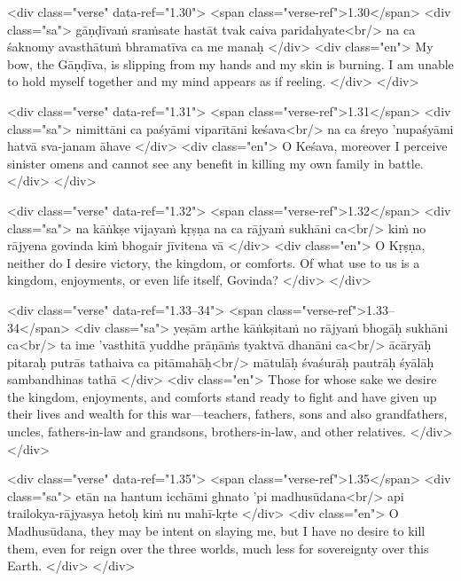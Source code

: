 \begin{html}
<div class="verse" data-ref="1.30">
  <span class="verse-ref">1.30</span>
  <div class="sa">
    gāṇḍīvaṁ sraṁsate hastāt tvak caiva paridahyate<br/>
    na ca śaknomy avasthātuṁ bhramatīva ca me manaḥ
  </div>
  <div class="en">
    My bow, the Gāṇḍīva, is slipping from my hands and my skin is burning. I am unable to hold myself together and my mind appears as if reeling.
  </div>
</div>
\end{html}



\begin{html}
<div class="verse" data-ref="1.31">
  <span class="verse-ref">1.31</span>
  <div class="sa">
    nimittāni ca paśyāmi viparītāni keśava<br/>
    na ca śreyo ’nupaśyāmi hatvā sva-janam āhave
  </div>
  <div class="en">
    O Keśava, moreover I perceive sinister omens and cannot see any benefit in killing my own family in battle.
  </div>
</div>
\end{html}



\begin{html}
<div class="verse" data-ref="1.32">
  <span class="verse-ref">1.32</span>
  <div class="sa">
    na kāṅkṣe vijayaṁ kṛṣṇa na ca rājyaṁ sukhāni ca<br/>
    kiṁ no rājyena govinda kiṁ bhogair jīvitena vā
  </div>
  <div class="en">
    O Kṛṣṇa, neither do I desire victory, the kingdom, or comforts. Of what use to us is a kingdom, enjoyments, or even life itself, Govinda?
  </div>
</div>
\end{html}



\begin{html}
<div class="verse" data-ref="1.33–34">
  <span class="verse-ref">1.33–34</span>
  <div class="sa">
    yeṣām arthe kāṅkṣitaṁ no rājyaṁ bhogāḥ sukhāni ca<br/>
    ta ime ’vasthitā yuddhe prāṇāṁs tyaktvā dhanāni ca<br/>
    ācāryāḥ pitaraḥ putrās tathaiva ca pitāmahāḥ<br/>
    mātulāḥ śvaśurāḥ pautrāḥ śyālāḥ sambandhinas tathā
  </div>
  <div class="en">
    Those for whose sake we desire the kingdom, enjoyments, and comforts stand ready to fight and have given up their lives and wealth for this war---teachers, fathers, sons and also grandfathers, uncles, fathers-in-law and grandsons, brothers-in-law, and other relatives.
  </div>
</div>
\end{html}



\begin{html}
<div class="verse" data-ref="1.35">
  <span class="verse-ref">1.35</span>
  <div class="sa">
    etān na hantum icchāmi ghnato ’pi madhusūdana<br/>
    api trailokya-rājyasya hetoḥ kiṁ nu mahī-kṛte
  </div>
  <div class="en">
    O Madhusūdana, they may be intent on slaying me, but I have no desire to kill them, even for reign over the three worlds, much less for sovereignty over this Earth.
  </div>
</div>
\end{html}



